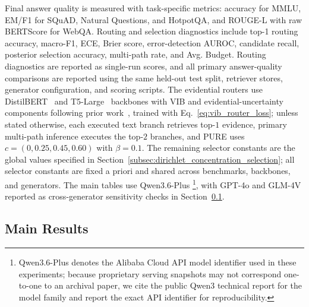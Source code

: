 \documentclass[a4paper,fleqn]{cas-dc}
\begin{document}
Final answer quality is measured with task-specific metrics: accuracy for MMLU, EM/F1 for SQuAD, Natural Questions, and HotpotQA, and ROUGE-L with raw BERTScore \citep{Zhang2020BERTScore} for WebQA. Routing and selection diagnostics include top-1 routing accuracy, macro-F1, ECE, Brier score, error-detection AUROC, candidate recall, posterior selection accuracy, multi-path rate, and Avg. Budget. Routing diagnostics are reported as single-run scores, and all primary answer-quality comparisons are reported using the same held-out test split, retriever stores, generator configuration, and scoring scripts. The evidential routers use DistilBERT~\citep{Sanh2019DistilBERT} and T5-Large~\citep{Raffel2020T5} backbones with VIB and evidential-uncertainty components following prior work~\citep{Alemi2017DeepVIB,Sensoy2018Evidential,Malinin2018PriorNetworks}, trained with Eq.~\eqref{eq:vib_router_loss}; unless stated otherwise, each executed text branch retrieves top-$1$ evidence, primary multi-path inference executes the top-$2$ branches, and PURE uses $c=(0,0.25,0.45,0.60)$ with $\beta=0.1$. The remaining selector constants are the global values specified in Section~\ref{subsec:dirichlet_concentration_selection}; all selector constants are fixed a priori and shared across benchmarks, backbones, and generators. The main tables use Qwen3.6-Plus \citep{Yang2025Qwen3TechnicalReport}\footnote{Qwen3.6-Plus denotes the Alibaba Cloud API model identifier used in these experiments; because proprietary serving snapshots may not correspond one-to-one to an archival paper, we cite the public Qwen3 technical report for the model family and report the exact API identifier for reproducibility.}, with GPT-4o \citep{OpenAI2024GPT4oSystemCard} and GLM-4V \citep{GLM2024ChatGLM} reported as cross-generator sensitivity checks in Section~\ref{subsec:main_results}.


\subsection{Main Results}
\label{subsec:main_results}
\end{document}
